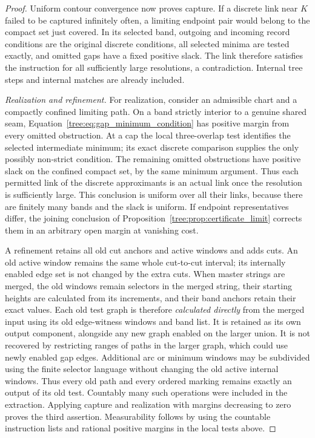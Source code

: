 \begin{proof}
Uniform contour convergence now proves capture.  If a discrete link
near $K$ failed to be captured infinitely often, a limiting endpoint
pair would belong to the compact set just covered.  In its selected
band, outgoing and incoming record conditions are the original
discrete conditions, all selected minima are tested exactly, and
omitted gaps have a fixed positive slack.  The link therefore satisfies
the instruction for all sufficiently large resolutions, a contradiction.
Internal tree steps and internal matches are already included.

\emph{Realization and refinement.}
For realization, consider an admissible chart and a compactly confined
limiting path.  On a band strictly interior to a genuine shared seam,
Equation~\eqref{tree:eq:gap_minimum_condition} has positive margin from
every omitted obstruction.  At a cap the local three-overlap test
identifies the selected intermediate minimum; its exact discrete
comparison supplies the only possibly non-strict condition.  The
remaining omitted obstructions have positive slack on the confined
compact set, by the same minimum argument.  Thus each permitted link
of the discrete approximants is an actual link once the resolution
is sufficiently large.  This conclusion is uniform over all their
links, because there are finitely many bands and the slack is uniform.
If endpoint representatives differ, the joining conclusion of
Proposition~\ref{tree:prop:certificate_limit} corrects them in an arbitrary
open margin at vanishing cost.

A refinement retains all old cut anchors and active windows and adds
cuts.  An old active window remains the same whole cut-to-cut interval;
its internally enabled edge set is not changed by the extra cuts.
When master strings are merged, the old windows remain selectors in
the merged string, their starting heights are calculated from its
increments, and their band anchors retain their exact values.  Each
old test graph is therefore \emph{calculated directly} from the merged
input using its old edge-witness windows and band list.  It is retained
as its own output component, alongside any new graph enabled on the
larger union.  It is not recovered by restricting ranges of paths in
the larger graph, which could use newly enabled gap edges.  Additional
arc or minimum windows may be subdivided using the finite selector
language without changing the old active internal windows.  Thus
every old path and every ordered marking remains exactly an output
of its old test.  Countably many
such operations were included in the extraction.  Applying capture
and realization with margins decreasing to zero proves the third
assertion.  Measurability follows by using the countable instruction
lists and rational positive margins in the local tests above.


\end{proof}
